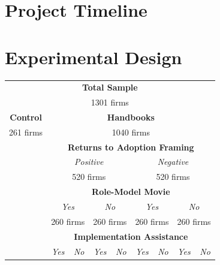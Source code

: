\documentclass[11.5pt]{article}
\begin{document}
\begin{appendices}
\begin{enumerate}
\end{enumerate}
\pagebreak
\section{Project Timeline} \label{sec.timeline}

\begin{figure}[h]
    \centering
    
\end{figure}

\pagebreak
\section{Experimental Design} \label{sec:design}

\begin{table}[h!]
  \centering
  \renewcommand{\arraystretch}{1.4}
  \begin{tabular}{|c|c|c|c|c|c|c|c|c|}
    \hline
    \multicolumn{9}{|c|}{\textbf{Total Sample}}\\
    \multicolumn{9}{|c|}{1301 firms}\\
    \hline
    \multicolumn{1}{|c}{\textbf{Control}} & \multicolumn{8}{|c|}{\textbf{Handbooks}}\\
    \multicolumn{1}{|c}{261 firms} & \multicolumn{8}{|c|}{1040 firms}\\
    \cline{2-9}
    \multicolumn{1}{|c}{} & \multicolumn{8}{|c|}{\textbf{Returns to Adoption Framing}}\\
    \cline{2-9}
    \multicolumn{1}{|c}{} & \multicolumn{4}{|c}{\textit{Positive}} & \multicolumn{4}{|c|}{\textit{Negative}}\\
    \multicolumn{1}{|c}{} & \multicolumn{4}{|c}{520 firms} & \multicolumn{4}{|c|}{520 firms}\\
    \cline{2-9}
    \multicolumn{1}{|c}{} & \multicolumn{8}{|c|}{\textbf{Role-Model Movie}}\\
    \cline{2-9}
    \multicolumn{1}{|c}{} & \multicolumn{2}{|c}{\textit{Yes}} & \multicolumn{2}{|c}{\textit{No}} & \multicolumn{2}{|c}{\textit{Yes}} & \multicolumn{2}{|c|}{\textit{No}}\\
    \multicolumn{1}{|c}{} & \multicolumn{2}{|c}{260 firms} & \multicolumn{2}{|c}{260 firms} & \multicolumn{2}{|c}{260 firms} & \multicolumn{2}{|c|}{260 firms}\\
    \cline{2-9}
    \multicolumn{1}{|c}{} & \multicolumn{8}{|c|}{\textbf{Implementation Assistance}}\\
    \cline{2-9}
    \multicolumn{1}{|c}{} & \multicolumn{1}{|c}{\textit{Yes}} & \multicolumn{1}{|c}{\textit{No}} & \multicolumn{1}{|c}{\textit{Yes}} & \multicolumn{1}{|c}{\textit{No}} & \multicolumn{1}{|c}{\textit{Yes}} & \multicolumn{1}{|c}{\textit{No}} & \multicolumn{1}{|c}{\textit{Yes}} & \multicolumn{1}{|c|}{\textit{No}}\\

\end{tabular}
\end{table}
\end{appendices}
\end{document}
